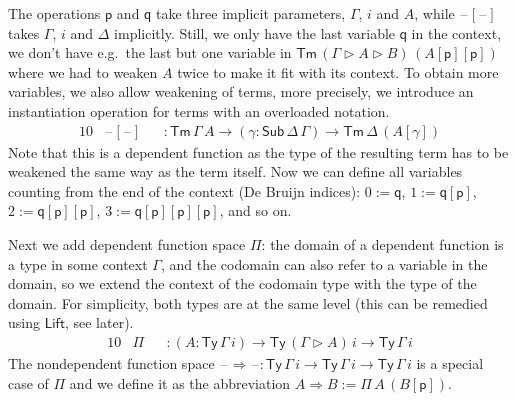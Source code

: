 \documentclass[a4paper,UKenglish]{article}
\newcommand{\ra}{\rightarrow}
\newcommand{\Ra}{\Rightarrow}
\newcommand{\Ty}{\mathsf{Ty}}
\newcommand{\Tm}{\mathsf{Tm}}
\newcommand{\Sub}{\mathsf{Sub}}
\newcommand{\p}{\mathsf{p}}
\newcommand{\q}{\mathsf{q}}
\newcommand{\ext}{\mathop{\triangleright}}
\newcommand{\blank}{\mathord{\hspace{1pt}\text{--}\hspace{1pt}}} %
\newcommand{\Lift}{\mathsf{Lift}}
\begin{document}
The operations $\p$ and $\q$ take three implicit parameters, $\Gamma$,
$i$ and $A$, while $\blank[\blank]$ takes $\Gamma$, $i$ and $\Delta$
implicitly. Still, we only have the last variable $\q$ in the context,
we don't have e.g.\ the last but one variable in $\Tm\,(\Gamma\ext
A\ext B)\,(A[\p][\p])$ where we had to weaken $A$ twice to make it fit
with its context. To obtain more variables, we also allow weakening of
terms, more precisely, we introduce an instantiation operation for
terms with an overloaded notation.
\begin{alignat*}{10}
& \blank[\blank] && : \Tm\,\Gamma\,A\ra(\gamma:\Sub\,\Delta\,\Gamma)\ra\Tm\,\Delta\,(A[\gamma])
\end{alignat*}
Note that this is a dependent function as the type of the resulting
term has to be weakened the same way as the term itself. Now we can
define all variables counting from the end of the context (De Bruijn
indices): $0 := \q$, $1 := \q[\p]$, $2 := \q[\p][\p]$,
$3 := \q[\p][\p][\p]$, and so on.

Next we add dependent function space $\Pi$: the domain of a dependent
function is a type in some context $\Gamma$, and the codomain can also
refer to a variable in the domain, so we extend the context of the
codomain type with the type of the domain. For simplicity, both types
are at the same level (this can be remedied using $\Lift$, see later).
\begin{alignat*}{10}
& \Pi && : (A:\Ty\,\Gamma\,i)\ra\Ty\,(\Gamma\ext A)\,i\ra\Ty\,\Gamma\,i
\end{alignat*}
The nondependent function space $\blank\Ra\blank :
\Ty\,\Gamma\,i\ra\Ty\,\Gamma\,i\ra\Ty\,\Gamma\,i$ is a special case of $\Pi$
and we define it as the abbreviation $A\Ra B := \Pi\,A\,(B[\p])$.
\end{document}
